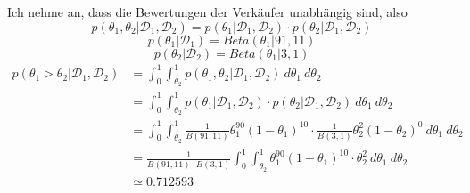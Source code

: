 \documentclass[10pt,a4paper]{article}
\begin{document}
Ich nehme an, dass die Bewertungen der Verkäufer unabhängig sind, also
\begin{equation}
  p(\theta_{1}, \theta_{2} | \mathcal{D}_{1}, \mathcal{D}_{2}) = p(\theta_{1} | \mathcal{D}_{1}, \mathcal{D}_{2}) \cdot  p(\theta_{2} | \mathcal{D}_{1}, \mathcal{D}_{2})
\end{equation}
\begin{equation}
  p(\theta_{1} | \mathcal{D}_{1}) = Beta(\theta_{1} | 91, 11)
\end{equation}
\begin{equation}
  p(\theta_{2} | \mathcal{D}_{2}) = Beta(\theta_{1} | 3, 1)
\end{equation}
\begin{align*}
  p(\theta_{1} > \theta_{2} | \mathcal{D}_{1}, \mathcal{D}_{2}) & = \int_{0}^{1} \int_{\theta_{2}}^{1} p(\theta_{1}, \theta_{2} | \mathcal{D}_{1}, \mathcal{D}_{2})\ d\theta_{1}\ d\theta_{2}\\
  & = \int_{0}^{1} \int_{\theta_{2}}^{1} p(\theta_{1} | \mathcal{D}_{1}, \mathcal{D}_{2}) \cdot p(\theta_{2} | \mathcal{D}_{1}, \mathcal{D}_{2})\ d\theta_{1}\ d\theta_{2}\\
  & = \int_{0}^{1} \int_{\theta_{2}}^{1} \frac{1}{B(91, 11)} \theta_{1}^{90}(1 - \theta_{1})^{10} \cdot \frac{1}{B(3, 1)} \theta_{2}^{2}(1 - \theta_{2})^{0}\ d\theta_{1}\ d\theta_{2}\\
  & = \frac{1}{B(91, 11) \cdot B(3, 1)} \int_{0}^{1} \int_{\theta_{2}}^{1} \theta_{1}^{90}(1 - \theta_{1})^{10} \cdot \theta_{2}^{2}\ d\theta_{1}\ d\theta_{2}\\
  & \simeq 0.712593
\end{align*}
\end{document}
